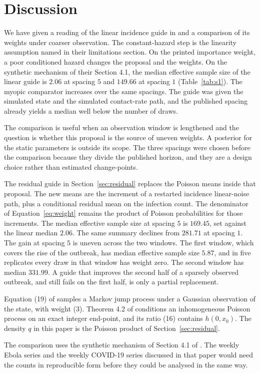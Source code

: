 \section{Discussion}
\label{sec:discussion}

We have given a reading of the linear incidence guide in \citet{whitaker2025} and a comparison of its weights under coarser observation. The constant-hazard step is the linearity assumption named in their limitations section. On the printed importance weight, a poor conditioned hazard changes the proposal and the weights. On the synthetic mechanism of their Section 4.1, the median effective sample size of the linear guide is \(2.06\) at spacing \(5\) and \(149.66\) at spacing \(1\) (Table~\ref{tab:s1}). The myopic comparator increases over the same spacings. The guide was given the simulated state and the simulated contact-rate path, and the published spacing already yields a median well below the number of draws.

The comparison is useful when an observation window is lengthened and the question is whether this proposal is the source of uneven weights. A posterior for the static parameters is outside its scope. The three spacings were chosen before the comparison because they divide the published horizon, and they are a design choice rather than estimated change-points.

The residual guide in Section~\ref{sec:residual} replaces the Poisson means inside that proposal. The new means are the increment of a restarted incidence linear-noise path, plus a conditional residual mean on the infection count. The denominator of Equation~\eqref{eq:weight} remains the product of Poisson probabilities for those increments. The median effective sample size at spacing \(5\) is \(169.45\), set against the linear median \(2.06\). The same summary declines from \(281.71\) at spacing \(1\). The gain at spacing \(5\) is uneven across the two windows. The first window, which covers the rise of the outbreak, has median effective sample size \(5.87\), and in five replicates every draw in that window has weight zero. The second window has median \(331.99\). A guide that improves the second half of a sparsely observed outbreak, and still fails on the first half, is only a partial replacement.

Equation (19) of \citet{golightly2019} samples a Markov jump process under a Gaussian observation of the state, with weight (3). Theorem 4.2 of \citet{corstanje2023} conditions an inhomogeneous Poisson process on an exact integer end-point, and its ratio (16) contains \(h(0, x_0)\). The density \(q\) in this paper is the Poisson product of Section~\ref{sec:residual}.

The comparison uses the synthetic mechanism of Section 4.1 of \citet{whitaker2025}. The weekly Ebola series and the weekly COVID-19 series discussed in that paper would need the counts in reproducible form before they could be analysed in the same way.
